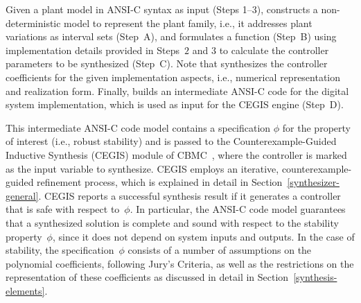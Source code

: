 \documentclass[final]{sig-alternate-05-2015}
\begin{document}
Given a plant model in ANSI-C syntax as input (Steps 1--3), \tool
constructs a non-deterministic model to represent the plant family,
i.e., it addresses plant variations as interval sets (Step~A),
and formulates a function (Step~B) using implementation details provided in
Steps~$2$ and $3$ to calculate the controller parameters to be
synthesized (Step~C).  Note that \tool synthesizes the controller 
coefficients for the given implementation aspects, i.e., numerical
representation and realization form.  Finally, \tool builds an intermediate 
ANSI-C code for the digital system implementation, which is used as input 
for the CEGIS engine (Step~D).

This intermediate ANSI-C code model contains a specification $\phi$ for the
property of interest (i.e., robust stability) and is passed to the
Counterexample-Guided Inductive Synthesis (CEGIS) module of
CBMC~\cite{ClarkeKL04}, where the controller is marked as the input variable
to synthesize.  CEGIS employs an iterative, counterexample-guided refinement
process, which is explained in detail in Section~\ref{synthesizer-general}. 
CEGIS reports a successful synthesis result if it generates a controller
that is safe with respect to~$\phi$.  In particular, the ANSI-C code model
guarantees that a synthesized solution is complete and sound with respect to
the stability property~$\phi$, since it does not depend on system inputs and
outputs.  In the case of stability, the specification~$\phi$ consists of a
number of assumptions on the polynomial coefficients, following Jury's
Criteria, as well as the restrictions on the representation of these
coefficients as discussed in detail in Section~\ref{synthesis-elements}.

\end{document}
